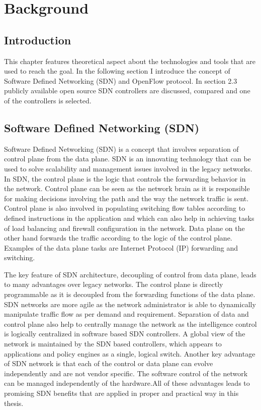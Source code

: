 \chapter{Background}
\label{ch:Analyse}
\section{Introduction}
This chapter features theoretical aspect about the technologies and tools that are used to reach the goal. In the following section I introduce the concept of Software Defined Networking (SDN) and OpenFlow protocol. In section 2.3 publicly available open source SDN controllers are discussed, compared and one of the controllers is selected.    
\section{Software Defined Networking (SDN)}
\label{ch:Analyse:sec:Abschnitt1}

Software Defined Networking (SDN) is a concept that involves separation of control plane from the data plane. SDN is an innovating technology that can be used to solve scalability and management issues involved in the legacy networks\cite{OpenFlow}.  In SDN, the control plane is the logic that controls the forwarding behavior in the network. Control plane can be seen as the network brain as it is responsible for making decisions involving the path and the way the network traffic is sent. Control plane is also involved in populating switching flow tables according to defined instructions in the application and which can also help in achieving tasks of load balancing and firewall configuration in the network. Data plane on the other hand forwards the traffic according to the logic of the control plane. Examples of the data plane tasks are Internet Protocol (IP) forwarding and switching\cite {OpenFlow}.

The key feature of SDN architecture, decoupling of control from data plane, leads to many advantages over legacy networks. The control plane is directly programmable as it is decoupled from the forwarding functions of the data plane. SDN networks are more agile as the network administrator is able to dynamically manipulate traffic flow as per demand and requirement. Separation of data and control plane also help to centrally manage the network as the intelligence control is logically centralized in software based SDN controllers. A global view of the network is maintained by the SDN based controllers, which appears to applications and policy engines as a single, logical switch. Another key advantage of SDN network is that each of the control or data plane can evolve independently and are not vendor specific. The software control of the network can be managed independently of the hardware\cite {OpenFlow}.All of these advantages leads to promising SDN benefits that are applied in proper and practical way in this thesis.  

